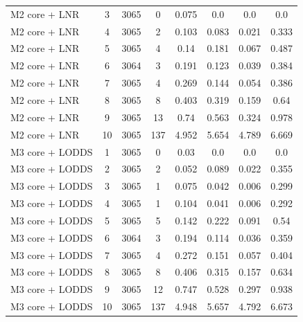 \begin{table}[htbp]
\begin{tabular*}{\textwidth}{@{\extracolsep{\fill}}lccccccc@{}}
M2 core + LNR & 3 & 3065 & 0 & 0.075 & 0.0 & 0.0 & 0.0 \\
M2 core + LNR & 4 & 3065 & 2 & 0.103 & 0.083 & 0.021 & 0.333 \\
M2 core + LNR & 5 & 3065 & 4 & 0.14 & 0.181 & 0.067 & 0.487 \\
M2 core + LNR & 6 & 3064 & 3 & 0.191 & 0.123 & 0.039 & 0.384 \\
M2 core + LNR & 7 & 3065 & 4 & 0.269 & 0.144 & 0.054 & 0.386 \\
M2 core + LNR & 8 & 3065 & 8 & 0.403 & 0.319 & 0.159 & 0.64 \\
M2 core + LNR & 9 & 3065 & 13 & 0.74 & 0.563 & 0.324 & 0.978 \\
M2 core + LNR & 10 & 3065 & 137 & 4.952 & 5.654 & 4.789 & 6.669 \\
M3 core + LODDS & 1 & 3065 & 0 & 0.03 & 0.0 & 0.0 & 0.0 \\
M3 core + LODDS & 2 & 3065 & 2 & 0.052 & 0.089 & 0.022 & 0.355 \\
M3 core + LODDS & 3 & 3065 & 1 & 0.075 & 0.042 & 0.006 & 0.299 \\
M3 core + LODDS & 4 & 3065 & 1 & 0.104 & 0.041 & 0.006 & 0.292 \\
M3 core + LODDS & 5 & 3065 & 5 & 0.142 & 0.222 & 0.091 & 0.54 \\
M3 core + LODDS & 6 & 3064 & 3 & 0.194 & 0.114 & 0.036 & 0.359 \\
M3 core + LODDS & 7 & 3065 & 4 & 0.272 & 0.151 & 0.057 & 0.404 \\
M3 core + LODDS & 8 & 3065 & 8 & 0.406 & 0.315 & 0.157 & 0.634 \\
M3 core + LODDS & 9 & 3065 & 12 & 0.747 & 0.528 & 0.297 & 0.938 \\
M3 core + LODDS & 10 & 3065 & 137 & 4.948 & 5.657 & 4.792 & 6.673 \\
\bottomrule
\end{tabular*}
\end{table}
